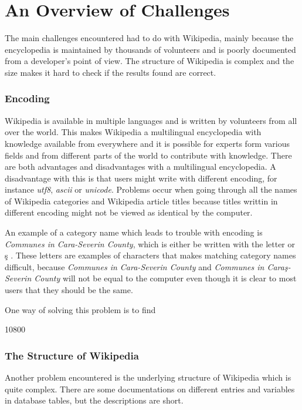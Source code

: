 \section{An Overview of Challenges}
The main challenges encountered had to do with Wikipedia, mainly because the encyclopedia is maintained by thousands of volunteers and is poorly documented from a developer's point of view. The structure of Wikipedia is complex and the size makes it hard to check if the results found are correct. 


\subsubsection{Encoding}
Wikipedia is available in multiple languages and is written by volunteers from all over the world. This makes Wikipedia a multilingual encyclopedia with knowledge available from everywhere and it is possible for experts form various fields and from different parts of the world to contribute with knowledge. There are both advantages and disadvantages with a multilingual encyclopedia. A disadvantage with this is that users might write with different encoding, for instance \emph{utf8}, \emph{ascii} or \emph{unicode}. Problems occur when going through all the names of Wikipedia categories and Wikipedia article titles because titles writtin in different encoding might not be viewed as identical by the computer. 

An example of a category name which leads to trouble with encoding is  \emph{Communes in Cara-Severin County}, which is either be written with the letter \emph{} \cite{swithcomma} or \c{s} \cite{swithcedilla}. These letters are examples of characters that makes matching category names difficult, because \emph{Communes in Cara-Severin County} and \emph{Communes in Cara\c{s}-Severin County} will not be equal to the computer even though it is clear to most users that they should be the same.

One way of solving this problem is to find

10800






\subsubsection{The Structure of Wikipedia}
Another problem encountered is the underlying structure of Wikipedia which is quite complex. There are some documentations on different entries and variables in database tables, but the descriptions are short. 

